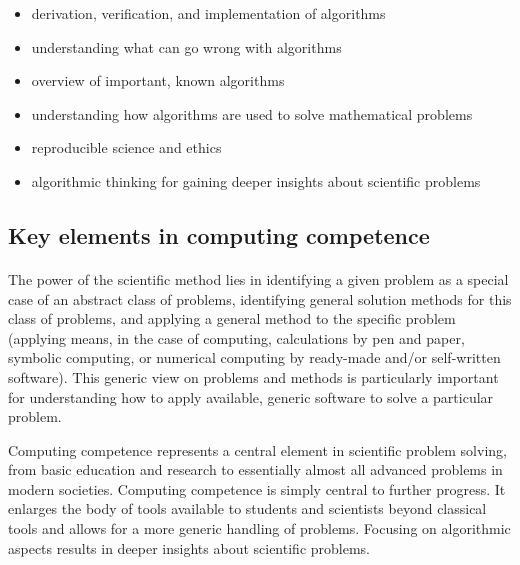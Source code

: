 \documentclass[%
oneside,                 %
final,                   %
10pt]{article}
\begin{document}
\begin{itemize}
\item derivation, verification, and implementation of algorithms

\item understanding what can go wrong with algorithms

\item overview of important, known algorithms

\item understanding how algorithms are used to solve mathematical problems

\item reproducible science and ethics

\item algorithmic thinking for gaining deeper insights about scientific problems
\end{itemize}

\noindent



\subsection*{Key elements in computing competence}

\paragraph{}
The power of the scientific method lies in identifying a given problem
as a special case of an abstract class of problems, identifying
general solution methods for this class of problems, and applying a
general method to the specific problem (applying means, in the case of
computing, calculations by pen and paper, symbolic computing, or
numerical computing by ready-made and/or self-written software). This
generic view on problems and methods is particularly important for
understanding how to apply available, generic software to solve a
particular problem.


Computing competence represents a central element
in scientific problem solving, from basic education and research to
essentially almost all advanced problems in modern
societies. Computing competence is simply central to further
progress. It enlarges the body of tools available to students and
scientists beyond classical tools and allows for a more generic
handling of problems. Focusing on algorithmic aspects results in
deeper insights about scientific problems.
\end{document}
